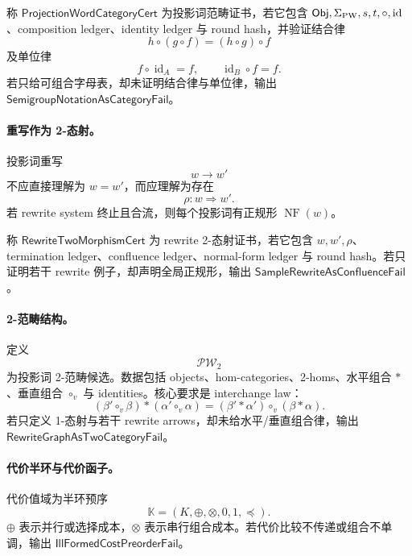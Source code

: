 \begin{definition}[投影词范畴证书]\label{def:typed-address-biaxial-completion-projection-word-category-cert}
称 \(\mathsf{ProjectionWordCategoryCert}\) 为投影词范畴证书，若它包含 \(\mathsf{Obj},\Sigma_{\rm PW},s,t,\circ,\operatorname{id}\)、composition ledger、identity ledger 与 round hash，并验证结合律
\[
h\circ(g\circ f)=(h\circ g)\circ f
\]
及单位律
\[
f\circ\operatorname{id}_A=f,\qquad \operatorname{id}_B\circ f=f.
\]
若只给可组合字母表，却未证明结合律与单位律，输出 \(\mathsf{SemigroupNotationAsCategoryFail}\)。
\end{definition}

\paragraph{重写作为 2-态射。}
投影词重写
\[
w\to w'
\]
不应直接理解为 \(w=w'\)，而应理解为存在
\[
\boxed{\rho:w\Rightarrow w'.}
\]
若 rewrite system 终止且合流，则每个投影词有正规形 \(\operatorname{NF}(w)\)。

\begin{definition}\label{def:typed-address-biaxial-completion-rewrite-two-morphism-cert}
称 \(\mathsf{RewriteTwoMorphismCert}\) 为 rewrite 2-态射证书，若它包含 \(w,w',\rho\)、termination ledger、confluence ledger、normal-form ledger 与 round hash。若只证明若干 rewrite 例子，却声明全局正规形，输出 \(\mathsf{SampleRewriteAsConfluenceFail}\)。
\end{definition}

\paragraph{2-范畴结构。}
定义
\[
\boxed{\mathcal{PW}_2}
\]
为投影词 2-范畴候选。数据包括 objects、hom-categories、2-homs、水平组合 \(\ast\)、垂直组合 \(\circ_v\) 与 identities。核心要求是 interchange law：
\[
\boxed{
(\beta'\circ_v\beta)\ast(\alpha'\circ_v\alpha)
=
(\beta'\ast\alpha')\circ_v(\beta\ast\alpha).
}
\]
若只定义 1-态射与若干 rewrite arrows，却未给水平/垂直组合律，输出 \(\mathsf{RewriteGraphAsTwoCategoryFail}\)。

\paragraph{代价半环与代价函子。}
代价值域为半环预序
\[
\boxed{
\mathbb K=(K,\oplus,\otimes,0,1,\preceq).
}
\]
\(\oplus\) 表示并行或选择成本，\(\otimes\) 表示串行组合成本。若代价比较不传递或组合不单调，输出 \(\mathsf{IllFormedCostPreorderFail}\)。

